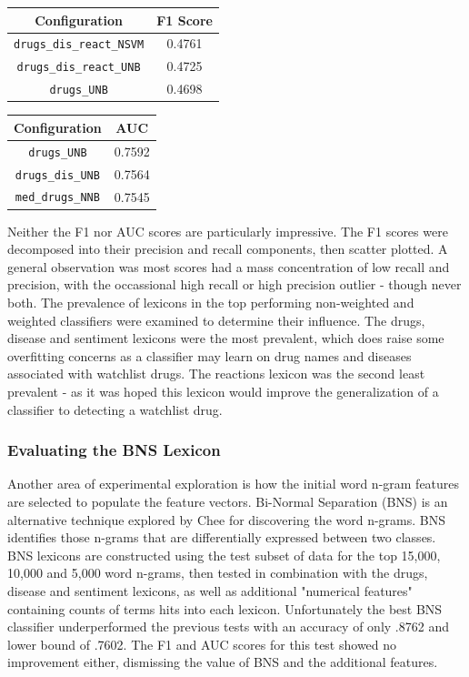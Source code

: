 \documentclass[twoside,11pt]{article}
\begin{document}
\begin{center}
  \begin{tabular}{||c c||}
    \hline
    Configuration & F1 Score\\
    \hline\hline
    \verb|drugs_dis_react_NSVM| & 0.4761 \\
    \hline
    \verb|drugs_dis_react_UNB| & 0.4725 \\
    \hline
    \verb|drugs_UNB| & 0.4698 \\
    \hline
  \end{tabular}
  \quad
  \begin{tabular}{||c c||}
    \hline Configuration & AUC \\
    \hline\hline
    \verb|drugs_UNB| & 0.7592 \\
    \hline
    \verb|drugs_dis_UNB| & 0.7564 \\
    \hline
    \verb|med_drugs_NNB| & 0.7545 \\
    \hline
  \end{tabular}
\end{center}
Neither the F1 nor AUC scores are particularly impressive. The F1 scores were decomposed into their precision and recall components, then scatter plotted. A general observation was most scores had a mass concentration of low recall and precision, with the occassional high recall or high precision outlier - though never both.
The prevalence of lexicons in the top performing non-weighted and weighted classifiers were examined to determine their influence. The drugs, disease and sentiment lexicons were the most prevalent, which does raise some overfitting concerns as a classifier may learn on drug names and diseases associated with watchlist drugs. The reactions lexicon was the second least prevalent - as it was hoped this lexicon would improve the generalization of a classifier to detecting a watchlist drug.

\subsubsection{Evaluating the BNS Lexicon}
Another area of experimental exploration is how the initial word n-gram features are selected to populate the feature vectors. Bi-Normal Separation (BNS) is an alternative technique explored by Chee for discovering the word n-grams. BNS identifies those n-grams that are differentially expressed between two classes. BNS lexicons are constructed using the test subset of data for the top 15,000, 10,000 and 5,000 word n-grams, then tested in combination with the drugs, disease and sentiment lexicons, as well as additional "numerical features" containing counts of terms hits into each lexicon. Unfortunately the best BNS classifier underperformed the previous tests with an accuracy of only .8762 and lower bound of .7602. The F1 and AUC scores for this test showed no improvement either, dismissing the value of BNS and the additional features.
\end{document}
